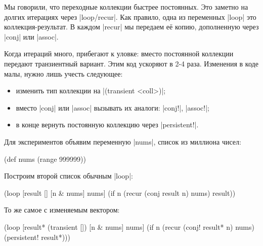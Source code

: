Мы говорили, что переходные коллекции быстрее постоянных. Это заметно на долгих
итерациях через \spverb|loop/recur|. Как правило, одна из переменных
\spverb|loop| это коллекция-результат. В каждом \spverb|recur| мы передаем е\"{е}
копию, дополненную через \spverb|conj| или \spverb|assoc|.

Когда итераций много, прибегают к уловке: вместо постоянной коллекции передают
транзиентный вариант. Этим код ускоряют в 2-4 раза. Изменения в коде малы,
нужно лишь учесть следующее:

\begin{itemize}

\item
  изменить тип коллекции на \spverb|(transient <coll>)|;

\item
  вместо \spverb|conj| или \spverb|assoc| вызывать их аналоги: \spverb|conj!|,
  \spverb|assoc!|;

\item
  в конце вернуть постоянную коллекцию через \spverb|persistent!|.

\end{itemize}

Для экспериментов объявим переменную \spverb|nums|, список из миллиона чисел:

\begin{english}
  \begin{clojure}
(def nums (range 999999))
  \end{clojure}
\end{english}


\noindent
Построим второй список обычным \spverb|loop|:

\begin{english}
  \begin{clojure}
(loop [result []
       [n & nums] nums]
  (if n
    (recur (conj result n) nums)
    result))
  \end{clojure}
\end{english}

\noindent
То же самое с изменяемым вектором:

\begin{english}
  \begin{clojure}
(loop [result* (transient [])
       [n & nums] nums]
  (if n
    (recur (conj! result* n) nums)
    (persistent! result*)))
  \end{clojure}
\end{english}


